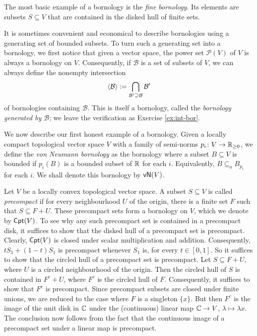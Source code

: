\begin{example}
    The most basic example of a bornology is the \emph{fine bornology}. Its elements are subsets \(S \subseteq V\) that are contained in the disked hull of finite sets.  
\end{example}

It is sometimes convenient and economical to describe bornologies using a generating set of bounded subsets. To turn such a generating set into a bornology, we first notice that given a vector space, the power set \(\mathcal{P}(V)\) of \(V\) is always a bornology on \(V\). Consequently, if \(\mathcal{B}\) is a set of subsets of \(V\), we can always define the nonempty intersection 
\[ \langle\mathcal{B}\rangle \mathrel{:=} \bigcap_{\mathcal{B}' \supseteq \mathcal{B}} \mathcal{B}'\] of bornologies containing \(\mathcal{B}\). This is itself a bornology, called the \emph{bornology generated by \(\mathcal{B}\)}; we leave the verification as Exercise \ref{ex:int-bor}.


\begin{example}
    We now describe our first honest example of a bornology. Given a locally compact topological vector space \(V\) with a family of semi-norms \(p_i \colon V \to \mathbb R_{\geq 0}\), we define the \emph{von Neumann bornology} as the bornology where a subset \(B \subseteq V\) is bounded if \(p_i(B)\) is a bounded subset of \(\mathbb R\) for each \(i\). Equivalently, \(B \subseteq_a B_{p_i}\) for each \(i\). We shall denote this bornology by \(\mathsf{vN}(V)\).
\end{example}

\begin{example}
    Let \(V\) be a locally convex topological vector space. A subset \(S \subseteq V\) is called \emph{precompact} if for every neighbourhood \(U\) of the origin, there is a finite set \(F\) such that \(S \subseteq F + U\). These precompact sets form a bornology on \(V\), which we denote by \(\mathsf{Cpt}(V)\). To see why any such precompact set is contained in a precompact disk, it suffices to show that the disked hull of a precompact set is precompact. Clearly, \(\mathsf{Cpt}(V)\) is closed under scalar multiplication and addition. Consequently, \(t S_1 + (1-t)S_1\) is precompact whenever \(S_1\) is, for every \(t\in [0,1]\). So it suffices to show that the circled hull of a precompact set is precompact. Let \(S \subseteq F + U\), where \(U\) is a circled neighbourhood of the origin. Then the circled hull of \(S\) is contained in \(F^c + U\), where \(F^c\) is the circled hull of \(F\). Consequently, it suffices to show that \(F^c\) is precompact. Since precompact subsets are closed under finite unions, we are reduced to the case where \(F\) is a singleton \(\{x\}\). But then \(F^c\) is the image of the unit disk in \(\mathbb C\) under the (continuous) linear map \(\mathbb C \to V\), \(\lambda \mapsto \lambda x\). The conclusion now follows from the fact that the continuous image of a precompact set under a linear map is precompact. 
\end{example}


